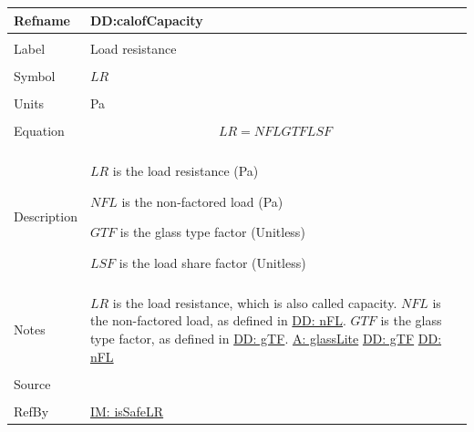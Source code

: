 \documentclass[12pt]{article}
\begin{document}
\noindent \begin{minipage}{\textwidth}
\begin{tabular}{p{} p{}}
\toprule \textbf{Refname} & \textbf{DD:calofCapacity}
\label{DD:calofCapacity}
\\ \midrule \\
Label & Load resistance
\\ \midrule \\
Symbol & $LR$
\\ \midrule \\
Units & Pa
\\ \midrule \\
Equation & \begin{displaymath}
           LR=NFL GTF LSF
           \end{displaymath}
\\ \midrule \\
Description & \begin{symbDescription}
              \item{$LR$ is the load resistance (Pa)}
              \item{$NFL$ is the non-factored load (Pa)}
              \item{$GTF$ is the glass type factor (Unitless)}
              \item{$LSF$ is the load share factor (Unitless)}
              \end{symbDescription}
\\ \midrule \\
Notes & $LR$ is the load resistance, which is also called capacity. $NFL$ is the non-factored load, as defined in \hyperref[DD:nFL]{DD: nFL}. $GTF$ is the glass type factor, as defined in \hyperref[DD:gTF]{DD: gTF}.
        \hyperref[assumpGL]{A: glassLite}
        \hyperref[DD:gTF]{DD: gTF}
        \hyperref[DD:nFL]{DD: nFL}
\\ \midrule \\
Source & \cite{astm2009}
\\ \midrule \\
RefBy & \hyperref[IM:isSafeLR]{IM: isSafeLR}
\\ \bottomrule \end{tabular}
\end{minipage}
\par~
\end{document}
